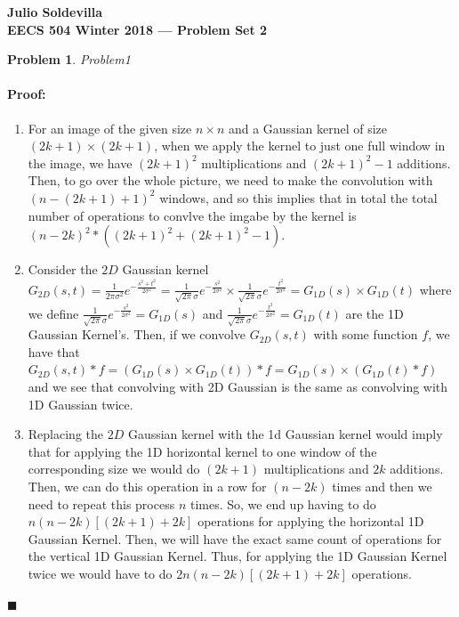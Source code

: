 \documentclass[12pt]{article}
\newenvironment{proof}{\paragraph{Proof: }}{\hfill$\blacksquare$}
\newtheorem{problem}{Problem}%
\begin{document}
\begin{center}
{\bf Julio Soldevilla}
\\
{\bf EECS 504 Winter 2018 --- Problem Set 2}
\end{center}

\begin{problem}
\normalfont
Problem1
\end{problem}

\begin{proof}
\begin{enumerate}

\item For an image of the given size $n \times n$ and a Gaussian kernel of size $(2k+1) \times (2k+1)$, when we apply the kernel to just one full window in the image, we have $(2k+1)^2$ multiplications and $(2k+1)^2-1$ additions. Then, to go over the whole picture, we need to make the convolution with $(n-(2k+1)+1)^2$ windows, and so this implies that in total the total number of operations to convlve the imgabe by the kernel is $(n-2k)^2 * ((2k+1)^2 + (2k+1)^2 -1)$.

\item Consider the $2D$ Gaussian kernel $G_{2D}(s,t) = \frac{1}{2\pi\sigma^2}e^{-\frac{s^2+t^2}{2\sigma^2}} = \frac{1}{\sqrt{2\pi}\sigma}e^{-\frac{s^2}{2\sigma^2}} \times \frac{1}{\sqrt{2\pi}\sigma}e^{-\frac{t^2}{2\sigma^2}} = G_{1D}(s)\times G_{1D}(t)$ where we define $\frac{1}{\sqrt{2\pi}\sigma}e^{-\frac{s^2}{2\sigma^2}}  = G_{1D}(s)$ and $\frac{1}{\sqrt{2\pi}\sigma}e^{-\frac{t^2}{2\sigma^2}} = G_{1D}(t)$ are the 1D Gaussian Kernel's. Then, if we convolve $G_{2D}(s,t)$ with some function $f$, we have that $G_{2D}(s,t)*f = (G_{1D}(s)\times G_{1D}(t))*f = G_{1D}(s)\times(G_{1D}(t)*f)$ and we see that convolving with 2D Gaussian is the same as convolving with 1D Gaussian twice. 

\item Replacing the $2D$ Gaussian kernel with the 1d Gaussian kernel would imply that for applying the 1D horizontal kernel to one window of the corresponding size we would do $(2k+1)$ multiplications and $2k$ additions. Then, we can do this operation in a row for $(n-2k)$ times and then we need to repeat this process $n$ times. So, we end up having to do $n(n-2k)[(2k+1) + 2k]$ operations for applying the horizontal 1D Gaussian Kernel. Then, we will have the exact same count of operations for the vertical 1D Gaussian Kernel. Thus, for applying the 1D Gaussian Kernel twice we would have to do $2n(n-2k)[(2k+1)+2k]$ operations. \\


\end{enumerate}
\end{proof}
\end{document}
